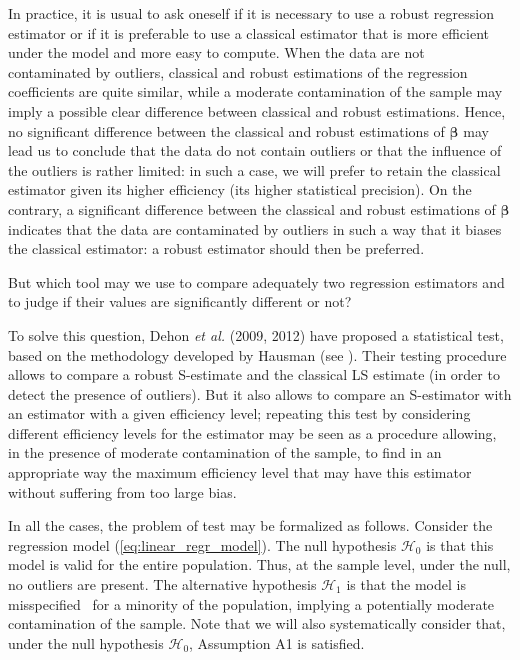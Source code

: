 In practice, it is usual to ask oneself if it is necessary to use a robust
regression estimator or if it is preferable to use a classical estimator that
is more efficient under the model and more easy to compute. When the data are
not contaminated by outliers, classical and robust estimations of the
regression coefficients are quite similar, while a moderate contamination of
the sample may imply a possible clear difference between classical and robust
estimations. Hence, no significant difference between the classical and robust
estimations of $\boldsymbol\beta$ may lead us to conclude that the data do
not contain outliers or that the influence of the outliers is rather limited:
in such a case, we will prefer to retain the classical estimator given its
higher efficiency (its higher statistical precision). On the contrary, a
significant difference between the classical and robust estimations of
$\boldsymbol\beta$ indicates that the data are contaminated by outliers in
such a way that it biases the classical estimator: a robust estimator should
then be preferred.

But which tool may we use to compare adequately two regression estimators and
to judge if their values are significantly different or not?

To solve this question, Dehon \textit{et al.} (2009, 2012) have proposed a
statistical test, based on the methodology developed by Hausman (see
\citealp{Hausman:1978}). Their testing procedure allows to compare a robust
S-estimate and the classical LS estimate (in order to detect the presence of
outliers). But it also allows to compare an S-estimator with an  estimator
with a given efficiency level; repeating this test by considering different
efficiency levels for the  estimator may be seen as a procedure allowing, in
the presence of moderate contamination of the sample, to find in an
appropriate way the maximum efficiency level that may have this  estimator
without suffering from too large bias.

In all the cases, the problem of test may be formalized as follows. Consider
the regression model (\ref{eq:linear_regr_model}). The null hypothesis
$\mathcal{H}_{0}$ is that this model is valid for the entire population. Thus,
at the sample level, under the null, no outliers are present. The alternative
hypothesis $\mathcal{H}_{1}$ is that the model is misspecified \ for a
minority of the population, implying a potentially moderate contamination of
the sample. Note that we will also systematically consider that, under the
null hypothesis $\mathcal{H}_{0}$, Assumption A1 is satisfied.

